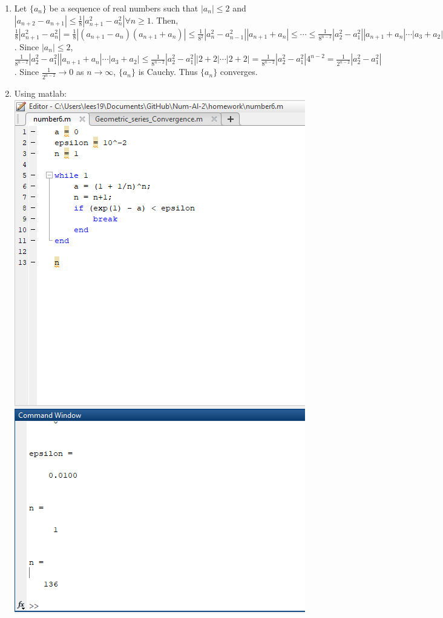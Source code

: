 \documentclass{article}
\begin{document}
\begin{enumerate}
    \item Let $\{a_n\}$ be a sequence of real numbers such that $|a_n| \leq 2$ and 
    $|a_{n+2} - a_{n+1}| \leq \frac{1}{8}|a_{n+1}^2 - a_n^2| \forall n\geq 1$. Then, 
    $\frac{1}{8}|a_{n+1}^2 - a_n^2| = \frac{1}{8}|(a_{n+1} - a_n)(a_{n+1} + a_n)|
    \leq \frac{1}{8^2}|a_n^2 - a_{n-1}^2||a_{n+1} + a_n| \leq \cdots \leq 
    \frac{1}{8^{n-2}}|a_2^2 - a_1^2||a_{n+1}+a_n|\cdots |a_3 + a_2|$. 
    Since $|a_n|\leq 2$, $\frac{1}{8^{n-2}}|a_2^2 - a_1^2||a_{n+1}+a_n|\cdots |a_3 + a_2|
    \leq \frac{1}{8^{n-2}}|a_2^2 - a_1^2||2+2|\cdots |2 + 2| = 
    \frac{1}{8^{n-2}}|a_2^2 - a_1^2|4^{n-2} = \frac{1}{2^{n-2}}|a_2^2 - a_1^2|$. Since 
    $\frac{1}{2^{n-2}}\rightarrow 0$ as $n\rightarrow \infty$, $\{a_n\}$ is Cauchy. Thus
    $\{a_n\}$ converges. 

    \item Using matlab:\\ 
    \includegraphics[scale = .8]{a.png}\\

\end{enumerate}
\end{document}

